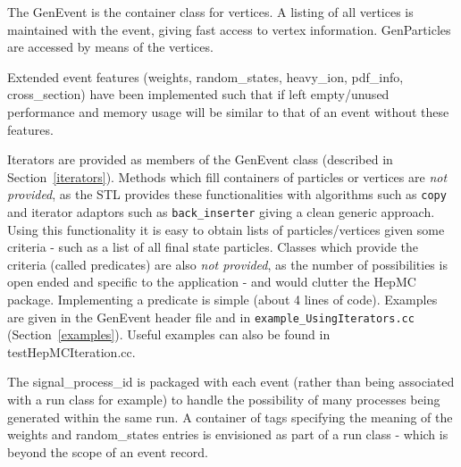 \documentclass[11pt,letterpaper]{article}
\begin{document}
The GenEvent is the container class for vertices. 
A listing of all vertices is maintained with the event, giving fast
access to vertex information. GenParticles are accessed by means of the
vertices.

Extended event features 
(weights, random\_states, heavy\_ion, pdf\_info, cross\_section) 
have been implemented such that if left empty/unused performance and memory
usage will be similar to that of an event without these features.

Iterators are provided as members of the GenEvent class
(described in Section~\ref{iterators}). Methods which fill containers of
particles or vertices are {\it not provided}, as the STL provides these
functionalities with algorithms such as \verb!copy! and iterator adaptors
such as \verb!back_inserter! giving a clean generic approach.
Using this functionality it is easy to obtain lists of
particles/vertices given some criteria - such as a list of all final
state particles. Classes which provide the criteria (called
predicates) are also {\it not provided}, as the number of
possibilities is open ended and specific to the application -
and would clutter the HepMC package. Implementing a predicate is
simple (about 4 lines of code).
Examples are given in the GenEvent header file and in
\verb!example_UsingIterators.cc! (Section~\ref{examples}).
Useful examples can also be found in testHepMCIteration.cc.

The signal\_process\_id is packaged with each event (rather than being
associated with a run class for example) to handle the possibility of
many processes being generated within the same run. A container of
tags specifying the meaning of the weights and random\_states entries
is envisioned as part of a run class - which is beyond the scope of an
event record.

%
%
\end{document}
